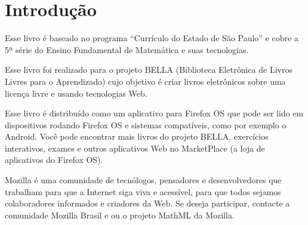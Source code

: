 \section*{Introdução}

Esse livro é baseado no programa ``Currículo do Estado de São Paulo''
e cobre a 5ª série do Ensino Fundamental de Matemática e suas tecnologias.

Esse livro foi realizado para o projeto BELLA
(Biblioteca Eletrônica de Livros Livres para o Aprendizado) cujo objetivo
é criar livros eletrônicos sobre uma licença livre e usando tecnologias Web.

Esse livro é distribuído como um aplicativo para Firefox OS que pode ser lido em
dispositivos rodando Firefox OS e sistemas compatíveis, como por exemplo o
Android. Você pode encontrar mais livros do projeto BELLA, exercícios
interativos, exames e outros aplicativos Web no MarketPlace (a loja de
aplicativos do Firefox OS).

Mozilla é uma comunidade de tecnólogos, pensadores e desenvolvedores que
trabalham para que a Internet siga viva e acessível, para que todos sejamos
colaboradores informados e criadores da Web. Se deseja participar, contacte a
comunidade Mozilla Brasil e ou o projeto MathML da Mozilla.
